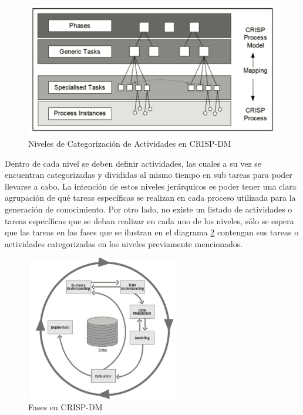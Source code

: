 \begin{figure}[ht]
  \begin{center}
  \includegraphics[width=1\textwidth]{./figures/chapter_02/14_crips_dm_hierarchical_process_model.png}
  \caption{Niveles de Categorización de Actividades en CRISP-DM}
  \label{fig:hierarchical_activity_levels}
  \end{center}
\end{figure}

Dentro de cada nivel se deben definir actividades, las cuales a su vez se encuentran categorizadas y divididas al mismo tiempo en sub tareas para poder llevarse a cabo. La intención de estos niveles jerárquicos es poder tener una clara agrupación de qué tareas específicas se realizan en cada proceso utilizada para la generación de conocimiento. Por otro lado, no existe un listado de actividades o tareas específicas que se deban realizar en cada uno de los niveles, sólo se espera que las tareas en las fases que se ilustran en el diagrama \ref{fig:crisp_dm_phases} contengan sus tareas o actividades categorizadas en los niveles previamente mencionados.

\begin{figure}[ht]
  \begin{center}
  \includegraphics[width=0.6\textwidth]{./figures/chapter_02/15_crips_dm_phases.png}
  \caption{Fases en CRISP-DM}
  \label{fig:crisp_dm_phases}
  \end{center}
\end{figure}


